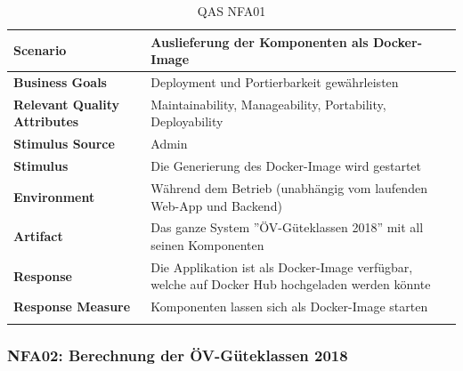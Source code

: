 \begin{longtable}{l p{10.6cm}}
        \toprule
        \textbf{Scenario}
                                & Auslieferung der Komponenten als Docker-Image\\
        \midrule
        \textbf{Business Goals}
                                & Deployment und Portierbarkeit gewährleisten \\
        \textbf{Relevant Quality Attributes}
                                & Maintainability, Manageability, Portability, Deployability\\
        \textbf{Stimulus Source}
                                & Admin\\
        \textbf{Stimulus}
                                & Die Generierung des Docker-Image wird gestartet\\
        \textbf{Environment}
                                & Während dem Betrieb (unabhängig vom laufenden Web-App und Backend)\\
        \textbf{Artifact}
                                & Das ganze System ''ÖV-Güteklassen 2018'' mit all seinen Komponenten\\
        \textbf{Response}
                                & Die Applikation ist als Docker-Image verfügbar, welche auf Docker Hub hochgeladen werden könnte\\  
        \textbf{Response Measure}
                                & Komponenten lassen sich als Docker-Image starten\\
                                  
        \bottomrule
    \caption{QAS NFA01}
    \label{table:nfa01}
\end{longtable}

\subsubsection{NFA02: Berechnung der ÖV-Güteklassen 2018}
\label{NFA:NFA02}

